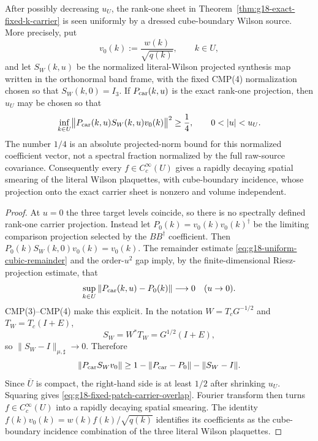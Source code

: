 \begin{corollary}
\label{cor:g18-no-dark-fixed-patch}
After possibly decreasing $u_U$, the rank-one sheet in
Theorem~\ref{thm:g18-exact-fixed-k-carrier} is seen uniformly by a dressed
cube-boundary Wilson source.  More precisely, put
\[
 v_0(k):=\frac{w(k)}{\sqrt{q(k)}},\qquad k\in U,
\]
and let $S_W(k,u)$ be the normalized literal-Wilson projected synthesis map
written in the orthonormal band frame, with the fixed CMP(4) normalization
chosen so that $S_W(k,0)=I_3$.  If $P_{\rm car}(k,u)$ is the exact rank-one
projection, then $u_U$ may be chosen so that
\begin{equation}
 \inf_{k\in U}
 \bigl\|P_{\rm car}(k,u)S_W(k,u)v_0(k)\bigr\|^2
 \ge\frac14,
 \qquad 0<|u|<u_U.
 \label{eq:g18-fixed-patch-carrier-overlap}
\end{equation}
The number $1/4$ is an absolute projected-norm bound for this normalized
coefficient vector, not a spectral fraction normalized by the full raw-source
covariance.  Consequently every $f\in C_c^\infty(U)$ gives a rapidly decaying
spatial smearing of the literal Wilson plaquettes, with cube-boundary
incidence, whose projection onto the exact carrier sheet is nonzero and
volume independent.
\end{corollary}

\begin{proof}
At $u=0$ the three target levels coincide, so there is no spectrally defined
rank-one carrier projection.  Instead let
$P_0(k)=v_0(k)v_0(k)^\dagger$ be the limiting comparison projection selected
by the $BB^\dagger$ coefficient.  Then
$P_0(k)S_W(k,0)v_0(k)=v_0(k)$.  The remainder estimate
\eqref{eq:g18-uniform-cubic-remainder} and the order-$u^2$ gap imply, by the
finite-dimensional Riesz-projection estimate, that
\[
 \sup_{k\in U}\|P_{\rm car}(k,u)-P_0(k)\|\longrightarrow0
 \quad (u\to0).
\]
CMP(3)--CMP(4) make this explicit.  In the notation
$W=T_cG^{-1/2}$ and $T_W=T_c(I+E)$,
\[
 S_W=W^*T_W=G^{1/2}(I+E),
\]
so $\|S_W-I\|_{\mu,\sharp}\to0$.  Therefore
\[
 \|P_{\rm car}S_Wv_0\|
 \ge1-\|P_{\rm car}-P_0\|-\|S_W-I\|.
\]
Since $\overline U$ is compact, the right-hand side is at least $1/2$ after
shrinking $u_U$.
Squaring gives \eqref{eq:g18-fixed-patch-carrier-overlap}.  Fourier transform
then turns $f\in C_c^\infty(U)$ into a rapidly decaying spatial smearing.
The identity
$f(k)v_0(k)=w(k)f(k)/\sqrt{q(k)}$ identifies its coefficients as the
cube-boundary incidence combination of the three literal Wilson plaquettes.
\end{proof}

